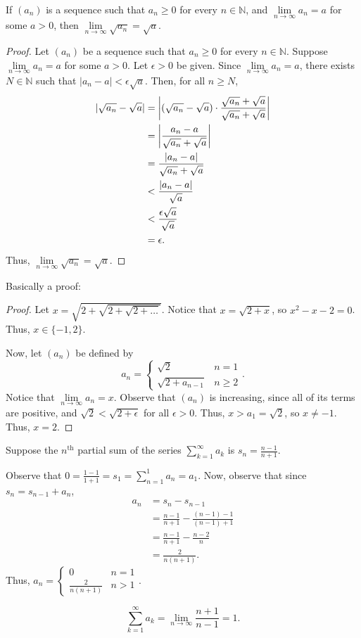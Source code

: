 \documentclass[12pt]{article}
\begin{document}
\newpage
{} If $(a_n)$ is a sequence such that $a_n \geq 0$ for every $n \in \mathbb N$, and $\lim\limits_{n\to\infty} a_n = a$ for some $a > 0$, then $\lim\limits_{n\to\infty} \sqrt{a_n} = \sqrt a$.
\begin{proof}
    Let $(a_n)$ be a sequence such that $a_n \geq 0$ for every $n \in \mathbb N$. Suppose $\lim\limits_{n\to\infty} a_n = a$ for some $a > 0$. Let $\epsilon > 0$ be given.
    Since $\lim\limits_{n\to\infty} a_n = a$, there exists $N \in \mathbb N$ such that $|a_n - a| < \epsilon\sqrt a$. Then, for all $n \geq N$,
    \begin{align*}
        |\sqrt{a_n} - \sqrt{a}| &= \bigg{|}(\sqrt{a_n} - \sqrt{a}) \cdot \frac{\sqrt{a_n} + \sqrt a}{\sqrt{a_n} + \sqrt a}\bigg{|} \\
                                &= \bigg{|}\frac{a_n - a}{\sqrt {a_n} + \sqrt a}\bigg{|} \\
                                &= \frac{|a_n - a|}{\sqrt {a_n} + \sqrt a} \\
                                &< \frac{|a_n - a|}{\sqrt a} \\
                                &< \frac{\epsilon\sqrt a}{\sqrt a} \\
                                &= \epsilon.
    \end{align*}
    Thus, $\lim\limits_{n\to\infty} \sqrt{a_n} = \sqrt a$.
\end{proof}

\newpage
{} Basically a proof:
    \begin{proof}
        Let $x = \sqrt{2 + \sqrt{2 + \sqrt{2 + \hdots}}}$. Notice that $x = \sqrt{2 + x}$, so $x^2 -x - 2 = 0$. Thus, $x \in \{-1, 2\}$.
        
        Now, let $(a_n)$ be defined by $$a_n = \begin{cases} \sqrt2 & n = 1 \\ \sqrt{2 + a_{n-1}} & n \geq 2 \end{cases}.$$ Notice that $\lim\limits_{n\to\infty} a_n = x$. Observe that $(a_n)$ is increasing, since all of its terms are positive, and $\sqrt{2} < \sqrt{2 + \epsilon}$ for all $\epsilon > 0$. Thus, $x > a_1 = \sqrt2$, so $x \neq -1$. Thus, $x = 2$.
    \end{proof}

\newpage
{} Suppose the $n^\text{th}$ partial sum of the series $\sum\limits_{k=1}^\infty a_k$ is $s_n = \frac{n-1}{n+1}$.

\medskip
{} Observe that $0 = \frac{1-1}{1+1} = s_1 = \sum\limits_{n=1}^1 a_n = a_1$. Now, observe that since $s_n = s_{n-1} + a_n$,
\begin{align*}
    a_n &= s_n - s_{n-1} \\
        &= \frac{n-1}{n+1} - \frac{(n-1) - 1}{(n-1) + 1} \\
        &= \frac{n-1}{n+1} - \frac{n - 2}{n} \\
        &= \frac{2}{n(n+1)}.
\end{align*}
Thus, $a_n = \begin{cases} 0 & n=1 \\ \frac{2}{n(n+1)} & n > 1\end{cases}$.

\medskip
{}

    $$\sum\limits_{k=1}^\infty a_k = \lim_{n\to\infty}\frac{n+1}{n-1} = 1.$$
\end{document}
